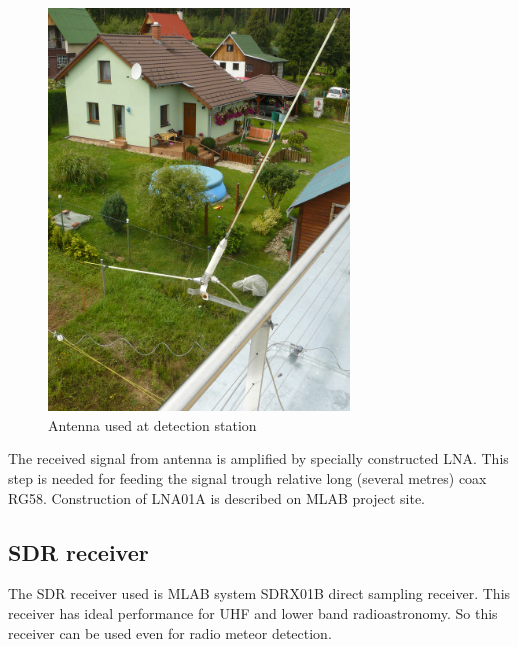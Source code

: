\documentclass[12pt,a4paper,oneside]{article}
\begin{document}
\begin{figure} [htbp]
\begin{center}
\includegraphics [width=80mm] {./img/GP143MHz.JPG} 
\end{center}
\caption{Antenna used at detection station}
\end{figure}

The received signal from antenna is amplified by specially constructed LNA. This step is needed for feeding the signal trough relative long (several metres) coax RG58. Construction of LNA01A is described on MLAB project site. 

\subsection{SDR receiver}

The SDR receiver used is MLAB system SDRX01B direct sampling receiver. This receiver has ideal performance for UHF and lower band radioastronomy.    So this receiver can be used even for radio meteor detection. 
\end{document}

